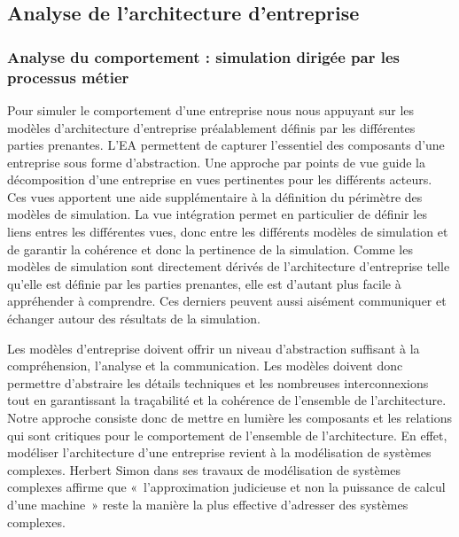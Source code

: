     \subsection{Analyse de l'architecture d'entreprise}

        \subsubsection{Analyse du comportement : simulation dirigée par les processus
métier}

Pour simuler le comportement d'une entreprise nous nous appuyant sur les modèles
d'architecture d'entreprise préalablement définis par les différentes parties
prenantes. L'EA permettent de capturer l'essentiel des composants d'une
entreprise sous forme d'abstraction. Une approche par points de vue guide la
décomposition d'une entreprise en vues pertinentes pour les différents acteurs.
Ces vues apportent une aide supplémentaire à la définition du périmètre des
modèles de simulation. La vue intégration permet en particulier de définir les
liens entres les différentes vues, donc entre les différents modèles de
simulation et de garantir la cohérence et donc la pertinence de la simulation.
Comme les modèles de simulation sont directement dérivés de l'architecture
d'entreprise telle qu'elle est définie par les parties prenantes, elle est
d'autant plus facile à appréhender à comprendre. Ces derniers peuvent aussi
aisément communiquer et échanger autour des résultats de la simulation.

Les modèles d'entreprise doivent offrir un niveau d'abstraction suffisant à la
compréhension, l'analyse et la communication. Les modèles doivent donc permettre
d'abstraire les détails techniques et les nombreuses interconnexions tout en
garantissant la traçabilité et la cohérence de l'ensemble de l'architecture.
Notre approche consiste donc de mettre en lumière les composants et les
relations qui sont critiques pour le comportement de l'ensemble de
l'architecture. En effet, modéliser l'architecture d'une entreprise revient à la
modélisation de systèmes complexes. Herbert Simon \cite{simon1990prediction}
dans ses travaux de modélisation de systèmes complexes affirme que
«~l'approximation judicieuse et non la puissance de calcul d'une machine~» reste
la manière la plus effective d'adresser des systèmes complexes.

